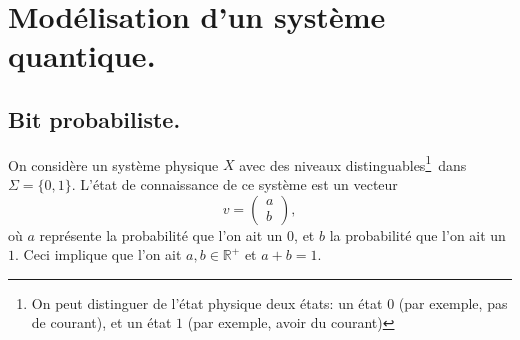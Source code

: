 \documentclass[./main]{subfiles}
\begin{document}
  \chapter{Modélisation d'un système quantique.}

  \section{Bit probabiliste.}

  On considère un système physique $X$ avec des niveaux distinguables\footnote{On peut distinguer de l'état physique deux états: un état $0$ (par exemple, pas de courant), et un état $1$ (par exemple, avoir du courant)}\showfootnote\ dans $\Sigma = \{0, 1\}$.
  L'état de connaissance de ce système est un vecteur \[
  v = \begin{pmatrix} a \\ b \end{pmatrix} 
  ,\] 
  où $a$ représente la probabilité que l'on ait un $0$, et $b$ la probabilité que l'on ait un $1$.
  Ceci implique que l'on ait $a, b \in \mathds{R}^+$ et $a + b = 1$.
\end{document}
